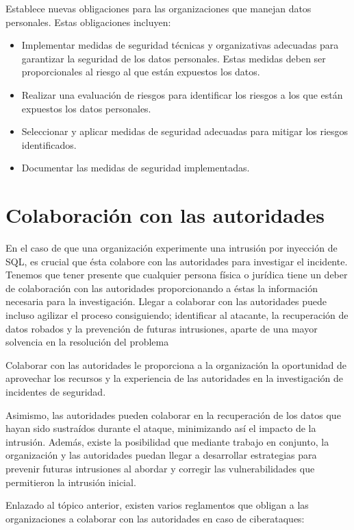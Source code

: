 \documentclass[11pt]{report}
\begin{document}
Establece nuevas obligaciones para las organizaciones que manejan datos personales. Estas obligaciones incluyen:
\begin{itemize}
  \item Implementar medidas de seguridad técnicas y organizativas adecuadas para garantizar la seguridad de los datos personales. Estas medidas deben
  ser proporcionales al riesgo al que están expuestos los datos.

  \item Realizar una evaluación de riesgos para identificar los riesgos a los que están expuestos los datos personales.
  
  \item Seleccionar y aplicar medidas de seguridad adecuadas para mitigar los riesgos identificados.
  
  \item Documentar las medidas de seguridad implementadas.
\end{itemize}

\section{Colaboración con las autoridades}
En el caso de que una organización experimente una intrusión por inyección de SQL, es crucial que ésta colabore con las autoridades para investigar el
incidente. Tenemos que tener presente que cualquier persona física o jurídica tiene un deber de colaboración con las autoridades proporcionando a éstas
la información necesaria para la investigación. Llegar a colaborar con las autoridades puede incluso agilizar el proceso consiguiendo; identificar al atacante,
la recuperación de datos robados y la prevención de futuras intrusiones, aparte de una mayor solvencia en la resolución del problema

Colaborar con las autoridades le proporciona a la organización la oportunidad de aprovechar los recursos y la experiencia de las autoridades en la investigación de incidentes de seguridad. 

Asimismo, las autoridades pueden colaborar en la recuperación de los datos que hayan sido sustraídos durante el ataque, minimizando así el impacto de la intrusión. 
Además, existe la posibilidad que mediante  trabajo en conjunto, la organización y las autoridades puedan llegar a desarrollar estrategias para prevenir futuras
intrusiones al abordar y corregir las vulnerabilidades que permitieron la intrusión inicial.

Enlazado al tópico anterior, existen varios reglamentos que obligan a las organizaciones a colaborar con las autoridades en caso de ciberataques:
\end{document}
